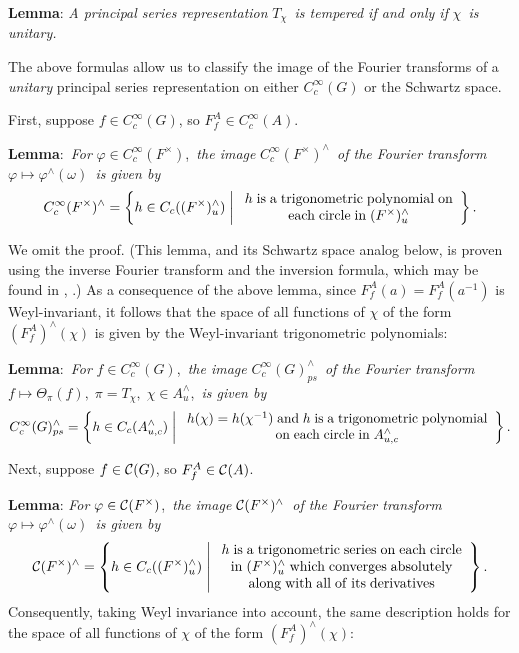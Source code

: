\documentclass[11pt, a4paper]{article}
\begin{document}
{\bf Lemma}: {\em A principal series representation }$T_\chi ${\em \ is
tempered if and only if }$\chi ${\em \ is unitary.}

The above formulas allow us to classify the image of the Fourier transforms
of a {\em unitary} principal series representation on either $C_c^\infty (G)$
or the Schwartz space.

First, suppose $f\in C_c^\infty (G)$, so $F_f^A\in C_c^\infty (A)$.

{\bf Lemma}:{\em \ For }$\varphi \in C_c^\infty (F^{\times })$,{\em \ the
image }$C_c^\infty (F^{\times })^{\wedge }${\em \ of the Fourier transform }$%
\varphi \longmapsto \varphi ^{\wedge }(\omega )${\em \ is given by}
\[
C_c^\infty (F^{\times })^{\wedge }=\left\{h\in C_c((F^{\times })_u^{\wedge
})\;\middle|\; 
\begin{array}{c}
h\;{\rm is\;a\;trigonometric\;polynomial\;on} \\ 
{\rm each\;circle\;in}\;(F^{\times })_u^{\wedge }
\end{array}
\right\}.
\]

We omit the proof. (This lemma, and its Schwartz space analog below, is
proven using the inverse Fourier transform and the inversion formula, which
may be found in \cite[pp.~43--44]{Ta}, \cite[ch.~12]{Ba}.) As a consequence of the above
lemma, since $F_f^A(a)=F_f^A(a^{-1})$ is Weyl-invariant, it follows that the space of all
functions of $\chi $ of the form $(F_f^A)^{\wedge }(\chi )$ is given by the Weyl-invariant trigonometric polynomials:

{\bf Lemma}:{\em \ For }$f\in C_c^\infty (G)$,{\em \ the image }$C_c^\infty
(G)_{ps}^{\wedge }${\em \ of the Fourier transform }$f\longmapsto \Theta
_\pi (f),\;\pi =T_\chi ,\;\chi \in A_u^{\wedge }$,{\em \ is given by}
\[
C_c^\infty (G)_{ps}^{\wedge }=\left\{h\in C_c(A_{u,c}^{\wedge })\;\middle|\; 
\begin{array}{c}
h(\chi )=h(\chi ^{-1})\;{\rm and}\;h\;{\rm is\;a\;trigonometric\;polynomial} \\ 
{\rm on\;each\;circle\;in}\;A_{u,c}^{\wedge }
\end{array}
\right\}.
\]

Next, suppose $f\in {\cal C}(G)$, so $F_f^A\in {\cal C}(A)$.

{\bf Lemma}: {\em For }$\varphi \in {\cal C}(F^{\times })$,{\em \ the image }%
${\cal C}(F^{\times })^{\wedge }${\em \ of the Fourier transform }$\varphi
\longmapsto \varphi ^{\wedge }(\omega )${\em \ is given by}
\[
{\cal C}(F^{\times })^{\wedge }=\left\{h\in C_c((F^{\times })_u^{\wedge })\;\middle|\; 
\begin{array}{c}
h\;{\rm is\;a\;trigonometric\;series\;on\;each\;circle} \\ 
{\rm in}\;(F^{\times })_u^{\wedge }\;{\rm which\;converges\;absolutely} \\ 
{\rm along\;with\;all\;of\;its\;derivatives}
\end{array}
\right\}.
\]
Consequently, taking Weyl invariance into account, the same description holds for the space of all
functions of $\chi $ of the form $(F_f^A)^{\wedge }(\chi )$:
\end{document}
